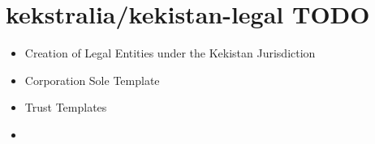 \section{kekstralia/kekistan-legal TODO} %
\label{sec:kekstralia_kekistan_todo}

\begin{itemize}
	\item Creation of Legal Entities under the Kekistan Jurisdiction
	\item Corporation Sole Template
	\item Trust Templates
	\item \todo{}
\end{itemize}
